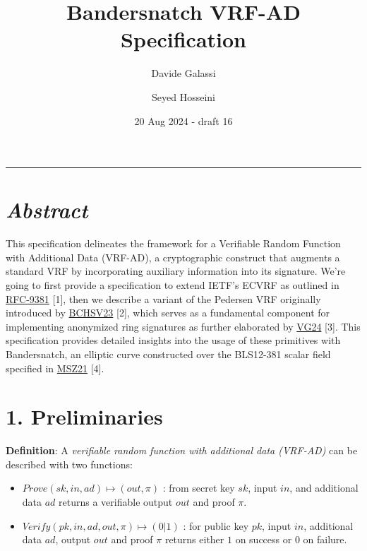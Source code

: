 \documentclass[
]{article}
\title{Bandersnatch VRF-AD Specification}
\author{Davide Galassi \and Seyed Hosseini}
\date{20 Aug 2024 - draft 16}
\begin{document}
\maketitle

\newcommand{\G}{\langle G \rangle}
\newcommand{\F}{\mathbb{Z}^*_r}

\begin{center}\rule{0.5\linewidth}{0.5pt}\end{center}

\hypertarget{abstract}{%
\section{\texorpdfstring{\emph{Abstract}}{Abstract}}\label{abstract}}

This specification delineates the framework for a Verifiable Random
Function with Additional Data (VRF-AD), a cryptographic construct that
augments a standard VRF by incorporating auxiliary information into its
signature. We're going to first provide a specification to extend IETF's
ECVRF as outlined in
\href{https://datatracker.ietf.org/doc/rfc9381}{RFC-9381} {[}1{]}, then
we describe a variant of the Pedersen VRF originally introduced by
\href{https://eprint.iacr.org/2023/002}{BCHSV23} {[}2{]}, which serves
as a fundamental component for implementing anonymized ring signatures
as further elaborated by
\href{https://github.com/davxy/ring-proof-spec}{VG24} {[}3{]}. This
specification provides detailed insights into the usage of these
primitives with Bandersnatch, an elliptic curve constructed over the
BLS12-381 scalar field specified in
\href{https://eprint.iacr.org/2021/1152}{MSZ21} {[}4{]}.

\hypertarget{preliminaries}{%
\section{1. Preliminaries}\label{preliminaries}}

\textbf{Definition}: A \emph{verifiable random function with additional
data (VRF-AD)} can be described with two functions:

\begin{itemize}
\item
  \(Prove(sk,in,ad) \mapsto (out,\pi)\) : from secret key \(sk\), input
  \(in\), and additional data \(ad\) returns a verifiable output \(out\)
  and proof \(\pi\).
\item
  \(Verify(pk,in,ad,out,\pi) \mapsto (0|1)\) : for public key \(pk\),
  input \(in\), additional data \(ad\), output \(out\) and proof \(\pi\)
  returns either \(1\) on success or \(0\) on failure.
\end{itemize}
\end{document}
